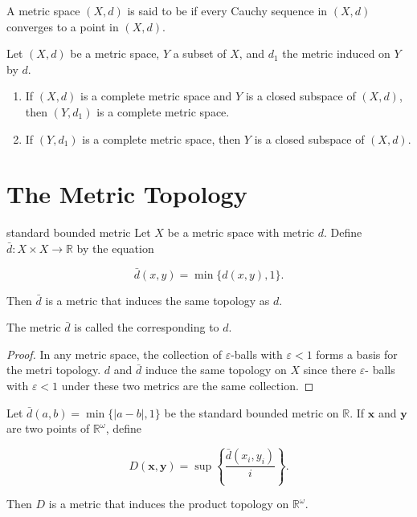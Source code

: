 \documentclass[../main.tex]{subfiles}
\begin{document}
\begin{definition}{}{}
A metric space $(X,d)$ is said to be  if every Cauchy sequence in $(X,d)$ converges to a point in $(X,d)$.
\end{definition}

\begin{proposition}{}{}
Let $(X,d)$ be a metric space, $Y$ a subset of $X$, and $d_1$ the metric induced on $Y$ by $d$.
\begin{enumerate}
    \item[(i)] If $(X,d)$ is a complete metric space and $Y$ is a closed subspace of $(X,d)$, then $(Y,d_1)$ is a complete metric space.
    \item[(ii)] If $(Y,d_1)$ is a complete metric space, then $Y$ is a closed subspace of $(X,d)$.
\end{enumerate}
\end{proposition}


\section{The Metric Topology}
\begin{theorem}{standard bounded metric}{}
Let $X$ be a metric space with metric $d$. Define $\bar{d}: X \times X \to \mathbb{R}$ by the equation

\[
\bar{d}(x, y) = \min\{d(x, y), 1\}.
\]

Then $\bar{d}$ is a metric that induces the same topology as $d$.
\end{theorem}

\begin{remark}
    
The metric $\bar{d}$ is called the  corresponding to $d$.
\end{remark}
\begin{proof}
    In any metric space, the collection of \(   \varepsilon   \)-balls with \(   \varepsilon < 1  \) forms a basis for the metri topology. \(  d  \) and \(  \bar{d}  \) induce the same topology on \(  X  \) since there \(   \varepsilon   \)- balls with \(   \varepsilon < 1  \) under these two metrics are the same collection.       
\end{proof}

\begin{theorem}{}{}
Let $\bar{d}(a,b) = \min\{|a-b|, 1\}$ be the standard bounded metric on $\mathbb{R}$. If $\mathbf{x}$ and $\mathbf{y}$ are two points of $\mathbb{R}^{\omega}$, define

\[
D(\mathbf{x}, \mathbf{y}) = \sup\left\{\frac{\bar{d}(x_i, y_i)}{i}\right\}.
\]

Then $D$ is a metric that induces the product topology on $\mathbb{R}^{\omega}$.
\end{theorem}
\end{document}
